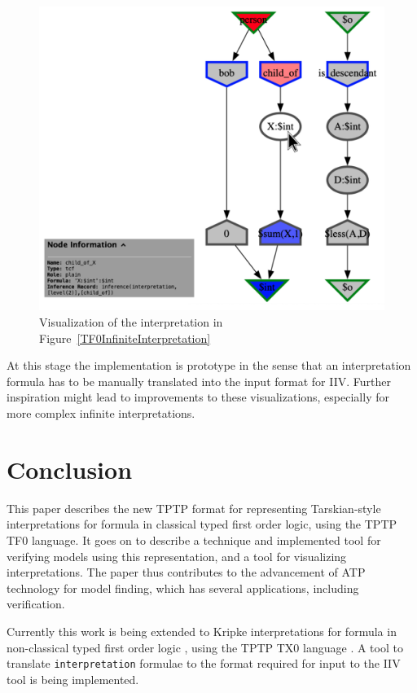 \documentclass[letterpaper]{article}
\newcommand{\smalltt}[1]{\small \texttt{#1}}
\begin{document}
\begin{figure}[htbp]
\includegraphics[width=\columnwidth]{TFF_Integer.s.IIV.pdf}
\caption{Visualization of the interpretation in Figure~\ref{TF0InfiniteInterpretation}}
\label{TF0InfiniteIIV}
\end{figure}

At this stage the implementation is prototype in the sense that an interpretation formula
has to be manually translated into the input format for IIV.
Further inspiration might lead to improvements to these visualizations, especially for more
complex infinite interpretations.

\section{Conclusion}
\label{Conclusion}

This paper describes the new TPTP format for representing Tarskian-style interpretations for
formula in classical typed first order logic, using the TPTP TF0 language.
It goes on to describe a technique and implemented tool for verifying models using this 
representation, and a tool for visualizing interpretations.
The paper thus contributes to the advancement of ATP technology for model finding, which has
several applications, including verification.

Currently this work is being extended to Kripke interpretations for formula in non-classical 
typed first order logic \cite{SF+22}, using the TPTP TX0 language \cite{Sut22-IGPL}.
A tool to translate \smalltt{interpretation} formulae to the format required for input to the 
IIV tool is being implemented.



\end{document}
